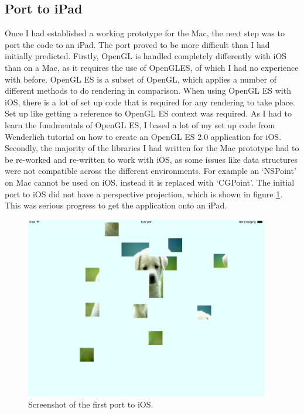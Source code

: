 \documentclass{article}
\begin{document}
\subsection{Port to iPad}
Once I had established a working prototype for the Mac, the next step was to
port the code to an iPad. The port proved to be more difficult than I had
initially predicted. Firstly, OpenGL is handled completely differently with iOS
than on a Mac, as it requires the use of \gls{OpenGLES}, of which I had no
experience with before. OpenGL ES is a subset of OpenGL, which applies a number
of different methods to do rendering in comparison. When using OpenGL ES with
iOS, there is a lot of set up code that is required for any rendering to take
place. Set up like getting a reference to OpenGL ES context was required. As I
had to learn the fundmentals of OpenGL ES, I based a lot of my set up code from
Wenderlich tutorial \cite{ref:RayOpenGL} on how to create an OpenGL ES 2.0
application for iOS. Secondly, the majority of the libraries I had written for
the Mac prototype had to be re-worked and re-written to work with iOS, as some
issues like data structures were not compatible across the different
environments. For example an `NSPoint' on Mac cannot be used on iOS, instead it
is replaced with `CGPoint'. The initial port to iOS did not have a perspective
projection, which is shown in figure \ref{fig:iPadPort}. This was serious
progress to get the application onto an iPad.

\begin{figure}[ht]
\begin{center}
\includegraphics[width=0.95\textwidth]{images/iPadPortImage}
\caption{Screenshot of the first port to iOS.}
\label{fig:iPadPort}
\end{center}
\end{figure}
\end{document}
